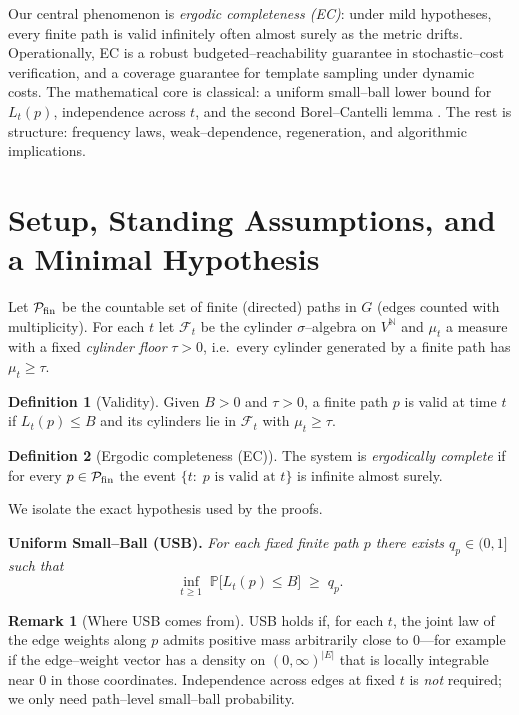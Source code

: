 \documentclass[11pt]{article}
\theoremstyle{plain}
\theoremstyle{definition}
\newtheorem{definition}{Definition}
\newtheorem{remark}{Remark}
\newcommand{\N}{\mathbb{N}}
\newcommand{\Prb}{\mathbb{P}}
\begin{document}
Our central phenomenon is \emph{ergodic completeness (EC)}: under mild hypotheses, every finite path is valid infinitely often almost surely as the metric drifts. Operationally, EC is a robust budgeted–reachability guarantee in stochastic–cost verification, and a coverage guarantee for template sampling under dynamic costs. The mathematical core is classical: a uniform small–ball lower bound for $L_t(p)$, independence across $t$, and the second Borel–Cantelli lemma \cite[§2.3]{Billingsley,Durrett}. The rest is structure: frequency laws, weak–dependence, regeneration, and algorithmic implications.

\section{Setup, Standing Assumptions, and a Minimal Hypothesis}
Let $\mathcal{P}_{\rm fin}$ be the countable set of finite (directed) paths in $G$ (edges counted with multiplicity). For each $t$ let $\mathcal{F}_t$ be the cylinder $\sigma$–algebra on $V^\N$ and $\mu_t$ a measure with a fixed \emph{cylinder floor} $\tau>0$, i.e.\ every cylinder generated by a finite path has $\mu_t\ge\tau$.

\begin{definition}[Validity]
Given $B>0$ and $\tau>0$, a finite path $p$ is valid at time $t$ if $L_t(p)\le B$ and its cylinders lie in $\mathcal{F}_t$ with $\mu_t\ge\tau$.
\end{definition}

\begin{definition}[Ergodic completeness (EC)]
The system is \emph{ergodically complete} if for every $p\in\mathcal{P}_{\rm fin}$ the event $\{t:\; p\text{ is valid at }t\}$ is infinite almost surely.
\end{definition}

We isolate the exact hypothesis used by the proofs.

\medskip
\noindent\textbf{Uniform Small–Ball (USB).}
\emph{For each fixed finite path $p$ there exists $q_p\in(0,1]$ such that
\[
\inf_{t\ge 1}\;\Prb\big[L_t(p)\le B\big]\;\ge\; q_p.
\]
}

\begin{remark}[Where USB comes from]
USB holds if, for each $t$, the joint law of the edge weights along $p$ admits positive mass arbitrarily close to $0$—for example if the edge–weight vector has a density on $(0,\infty)^{|E|}$ that is locally integrable near $0$ in those coordinates. Independence across edges at fixed $t$ is \emph{not} required; we only need path–level small–ball probability.
\end{remark}
\end{document}
